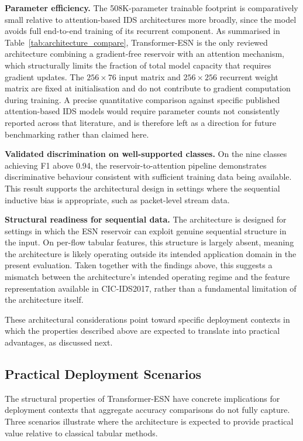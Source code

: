 \documentclass[5p,times]{elsarticle}
\begin{document}
	\textbf{Parameter efficiency.}
	The 508K-parameter trainable footprint is comparatively small relative
	to attention-based IDS architectures more broadly, since the model
	avoids full end-to-end training of its recurrent component. As
	summarised in Table~\ref{tab:architecture_compare}, Transformer-ESN is
	the only reviewed architecture combining a gradient-free reservoir with
	an attention mechanism, which structurally limits the fraction of total
	model capacity that requires gradient updates. The
	$256{\times}76$ input matrix and $256{\times}256$ recurrent weight
	matrix are fixed at initialisation and do not contribute to gradient
	computation during training. A precise quantitative comparison against
	specific published attention-based IDS models would require parameter
	counts not consistently reported across that literature, and is
	therefore left as a direction for future benchmarking rather than
	claimed here.
	
	\textbf{Validated discrimination on well-supported classes.}
	On the nine classes achieving F1 above 0.94, the reservoir-to-attention
	pipeline demonstrates discriminative behaviour consistent with
	sufficient training data being available. This result supports the
	architectural design in settings where the sequential inductive bias
	is appropriate, such as packet-level stream data.
	
	\textbf{Structural readiness for sequential data.}
	The architecture is designed for settings in which the ESN reservoir
	can exploit genuine sequential structure in the input. On per-flow
	tabular features, this structure is largely absent, meaning the
	architecture is likely operating outside its intended application
	domain in the present evaluation. Taken together with the findings
	above, this suggests a mismatch between the architecture's intended
	operating regime and the feature representation available in
	CIC-IDS2017, rather than a fundamental limitation of the architecture
	itself.
	
	These architectural considerations point toward specific deployment
	contexts in which the properties described above are expected to
	translate into practical advantages, as discussed next.
	
	\subsection{Practical Deployment Scenarios}
	\label{subsec:deployment}
	
	The structural properties of Transformer-ESN have concrete implications
	for deployment contexts that aggregate accuracy comparisons do not
	fully capture. Three scenarios illustrate where the architecture is
	expected to provide practical value relative to classical tabular
	methods.
	
\end{document}
